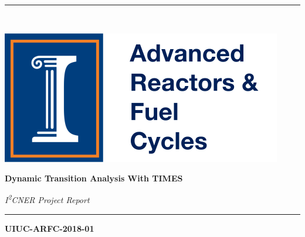 \documentclass[14pt,a4paper]{article} %
\begin{document}
\begin{titlepage} %
    \newcommand{\HRule}{\rule{\linewidth}{0.5mm}} %
    
    \center %

    
    \HRule\\[0.2cm]
    
     \begin{minipage}{0.4\textwidth}
        \includegraphics[width=\textwidth]{arfc-logo}
        \end{minipage}%
        \begin{minipage}{0.6\textwidth}
        {\begin{flushright}\huge\bfseries Dynamic Transition Analysis With TIMES\end{flushright}}
        {\begin{flushright}\large\textit{ I\textsuperscript{2}CNER Project Report}\end{flushright}}

        \end{minipage}

    \vspace{0.2cm}
    \HRule
    \vspace{0.5cm}
    
    

    \vspace{1cm}
    \textsc{\LARGE\bfseries UIUC-ARFC-2018-01} %
    \vspace{0.5cm}
    

\end{titlepage}
\end{document}

